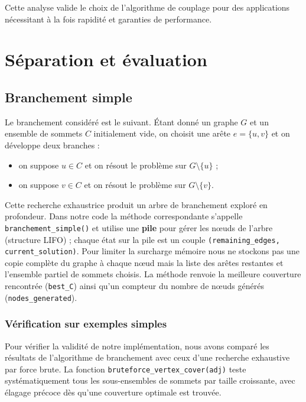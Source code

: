 \documentclass[11pt,a4paper]{article}
\begin{document}
Cette analyse valide le choix de l'algorithme de couplage pour des applications nécessitant à la fois rapidité et garanties de performance.

\section{S\'eparation et \'evaluation}

\subsection{Branchement simple}

Le branchement consid\'er\'e est le suivant. \'Etant donn\'e un graphe $G$ et un ensemble
de sommets $C$ initialement vide, on choisit une ar\^ete $e=\{u,v\}$ et on d\'eveloppe deux
branches :
\begin{itemize}
  \item on suppose $u\in C$ et on r\'esout le probl\`eme sur $G\setminus\{u\}$ ;
  \item on suppose $v\in C$ et on r\'esout le probl\`eme sur $G\setminus\{v\}$.
\end{itemize}

Cette recherche exhaustrice produit un arbre de branchement explor\'e en profondeur.  
Dans notre code la m\'ethode correspondante s'appelle \texttt{branchement\_simple()} et utilise
une \textbf{pile} pour g\'erer les nœuds de l’arbre (structure LIFO) ; chaque \'etat sur la
pile est un couple \texttt{(remaining\_edges, current\_solution)}. Pour limiter la surcharge
m\'emoire nous ne stockons pas une copie compl\`ete du graphe \`a chaque nœud mais la liste
des ar\^etes restantes et l’ensemble partiel de sommets choisis. La m\'ethode renvoie la
meilleure couverture rencontr\'ee (\texttt{best\_C})
ainsi qu’un compteur du nombre de nœuds g\'en\'er\'es
(\texttt{nodes\_generated}).

\subsubsection{Vérification sur exemples simples}

Pour vérifier la validité de notre implémentation, nous avons comparé les résultats de l'algorithme de branchement avec ceux d'une recherche exhaustive par force brute. La fonction \texttt{bruteforce\_vertex\_cover(adj)} teste systématiquement tous les sous-ensembles de sommets par taille croissante, avec élagage précoce dès qu'une couverture optimale est trouvée.
\end{document}
